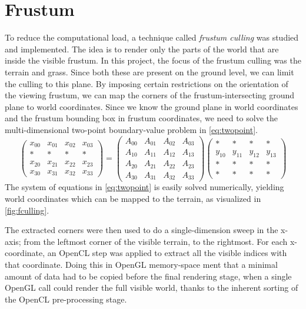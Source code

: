 \section{Frustum}
\label{cha:frustum}
To reduce the computational load, a technique called \textit{frustum culling}
was studied and implemented. The idea is to render only the parts of the
world that are inside the visible frustum.
In this project, the focus of the frustum culling was the terrain and grass.
Since both these are present on the ground level, we can limit the culling
to this plane. By imposing certain restrictions on the orientation of the viewing frustum,
we can map the corners of the frustum-intersecting ground plane to world coordinates.
Since we know the ground plane in world coordinates and the frustum bounding box in
frustum coordinates, we need to solve the multi-dimensional two-point boundary-value problem in \eqref{eq:twopoint}.
\begin{equation}
    \label{eq:twopoint}
    \left(
\begin{array}{cccc}
x_{00} & x_{01} & x_{02} & x_{03} \\
* & * & * & * \\
x_{20} & x_{21} & x_{22} & x_{23} \\
x_{30} & x_{31} & x_{32} & x_{33}
\end{array}
\right ) =
\left(
\begin{array}{cccc}
A_{00} & A_{01} & A_{02} & A_{03} \\
A_{10} & A_{11} & A_{12} & A_{13} \\
A_{20} & A_{21} & A_{22} & A_{23} \\
A_{30} & A_{31} & A_{32} & A_{33}
\end{array}
\right )
\left(
\begin{array}{cccc}
* & * & * & * \\
y_{10} & y_{11} & y_{12} & y_{13} \\
* & * & * & * \\
* & * & * & *
\end{array}
\right )
\end{equation}
The system of equations in \eqref{eq:twopoint} is easily solved numerically,
yielding world coordinates which can be mapped to the terrain, as visualized in \ref{fig:fculling}.

The extracted corners were then used to do a single-dimension sweep in the x-axis; from the leftmost corner of the visible terrain, to the rightmost.
For each x-coordinate, an OpenCL step was applied to extract all the visible indices with that coordinate.
Doing this in OpenGL memory-space ment that a minimal amount of data had to be copied before the
final rendering stage, when a single OpenGL call could render the full visible world, thanks to
the inherent sorting of the OpenCL pre-processing stage.
